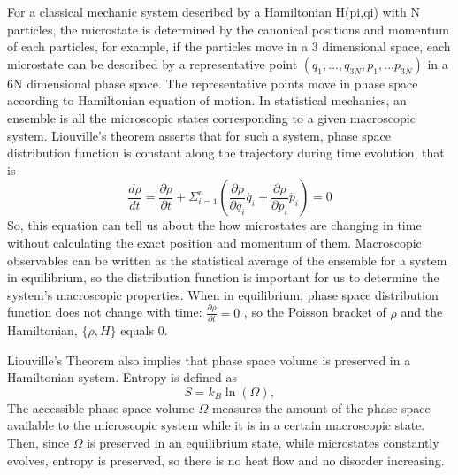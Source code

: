 For a classical mechanic system described by a Hamiltonian H(pi,qi) with N particles, the microstate is determined by the canonical positions and momentum of each particles, for example, if the particles move in a 3 dimensional space, each microstate can be described by a representative point $(q_{1},...,q_{3N},p_{1},...p_{3N})$ in a 6N dimensional phase space. The representative points move in phase space according to Hamiltonian equation of motion. In statistical mechanics, an ensemble is all the microscopic states corresponding to a given macroscopic system. Liouville’s theorem asserts that for such a system, phase space distribution function is constant along the trajectory during time evolution, that is
\begin{equation}
\frac{d\rho}{dt} = \frac{\partial\rho}{\partial t} + \Sigma_{i = 1}^{n}(\frac{\partial\rho}{\partial q_{i}}\dot{q_{i}}+\frac{\partial\rho}{\partial p_{i}}\dot{p_{i}}) = 0
\end{equation}
So, this equation can tell us about the how microstates are changing in time without calculating the exact position and momentum of them. Macroscopic observables can be written as the statistical average of the ensemble for a system in equilibrium, so the distribution function is important for us to determine the system’s macroscopic properties. When in equilibrium, phase space distribution function does not change with time: $\frac{\partial\rho}{\partial t} = 0$
, so the Poisson bracket of $\rho$ and the Hamiltonian, $\{\rho, H\}$ equals 0.

Liouville’s Theorem also implies that phase space volume is preserved in a Hamiltonian system.
Entropy is defined as
\begin{equation}
	S = k_B\ln(\Omega),
	\label{eqS}
\end{equation}
The accessible phase space volume $\Omega$ measures the amount of the phase space available to the microscopic system while it is in a certain macroscopic state. Then, since $\Omega$ is preserved in an equilibrium state, while microstates constantly evolves, entropy is preserved, so there is no heat flow and no disorder increasing.
